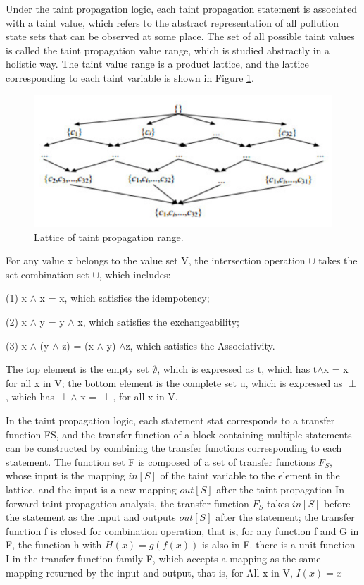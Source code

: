 \documentclass{article}
\begin{document}
Under the taint propagation logic, each taint propagation statement is associated with a taint value, which refers to the abstract representation of all pollution state sets that can be observed at some place. The set of all possible taint values is called the taint propagation value range, which is studied abstractly in a holistic way. The taint value range is a product lattice, and the lattice corresponding to each taint variable is shown in Figure \ref{fig:Lattice}.

\begin{figure}[ht]
  \centering
  \includegraphics[scale=0.4]{Lattice.png}
  \caption{Lattice of taint propagation range.}
  \label{fig:Lattice}
\end{figure}
For any value x belongs to the value set V, the intersection operation $\cup$ takes the set combination set $\cup$, which includes: 

(1) x $ \wedge $ x = x, which satisfies the idempotency; 

(2) x $ \wedge $ y = y $ \wedge $ x, which satisfies the exchangeability;

(3) x $ \wedge $ (y $ \wedge $ z) = (x $ \wedge $ y) $ \wedge $z, which satisfies the Associativity. 

The top element is the empty set $\emptyset$, which is expressed as t, which has t$ \wedge $x = x for all x in V; the bottom element is the complete set u, which is expressed as $\perp$, which has $\perp\wedge$ x = $\perp$, for all x in V.

In the taint propagation logic, each statement stat corresponds to a transfer function FS, and the transfer function of a block containing multiple statements can be constructed by combining the transfer functions corresponding to each statement. The function set F is composed of a set of transfer functions $F_{S}$, whose input is the mapping $in[S]$ of the taint variable to the element in the lattice, and the input is a new mapping $out[S]$ after the taint propagation In forward taint propagation analysis, the transfer function $F_{S}$ takes $in[S]$ before the statement as the input and outputs $out[S]$ after the statement; the transfer function f is closed for combination operation, that is, for any function f and G in F, the function h with $H(x) = g(f(x))$ is also in F. there is a unit function I in the transfer function family F, which accepts a mapping as the same mapping returned by the input and output, that is, for All x in V, $I(x) = x$
\end{document}
